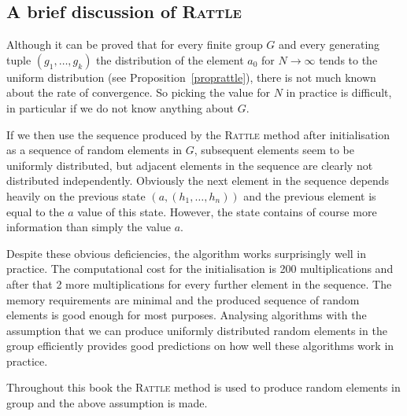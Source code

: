 \subsection{A brief discussion of \textsc{Rattle}}

Although it can be proved that for every finite group $G$ and every
generating tuple $(g_1, \ldots, g_k)$ the distribution of the element
$a_0$ for $N \to \infty$ tends to the uniform distribution (see
Proposition~\ref{proprattle}), there is
not much known about the rate of convergence. So picking the value for
$N$ in practice is difficult, in particular if we do not know anything
about $G$.

If we then use the sequence produced by the \textsc{Rattle} method
after initialisation as a sequence of random elements in $G$, 
subsequent elements seem to be uniformly distributed, but adjacent
elements in the sequence are clearly not distributed independently.
Obviously the next element in the sequence depends heavily on the
previous state $(a,(h_1,\ldots,h_n))$ and the previous element is
equal to the $a$ value of this state. However, the state contains of
course more information than simply the value $a$.

Despite these obvious deficiencies, the algorithm
works surprisingly well in practice. The computational cost for the 
initialisation is 200 multiplications and after that 2 more
multiplications for every further element in the sequence.
The memory requirements are minimal and the produced sequence of
random elements is good enough for most purposes. Analysing algorithms
with the assumption that we can produce uniformly distributed random
elements in the group efficiently provides good predictions on how
well these algorithms work in practice.

Throughout this book the \textsc{Rattle} method is used to produce
random elements in group and the above assumption is made.

